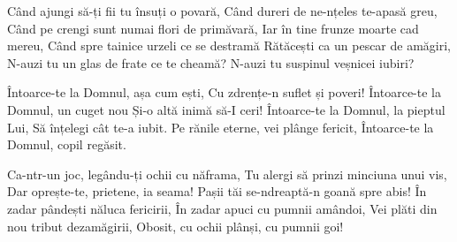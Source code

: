\beginverse
Când ajungi să-ți fii tu însuți o povară,
Când dureri de ne-nțeles te-apasă greu,
Când pe crengi sunt numai flori de primăvară,
Iar în tine frunze moarte cad mereu,
Când spre tainice urzeli ce se destramă
Rătăcești ca un pescar de amăgiri,
N-auzi tu un glas de frate ce te cheamă?
N-auzi tu suspinul veșnicei iubiri?
\endverse

\beginchorus
Întoarce-te la Domnul, așa cum ești,
Cu zdrențe-n suflet și poveri!
Întoarce-te la Domnul, un cuget nou
Și-o altă inimă să-I ceri!
Întoarce-te la Domnul, la pieptul Lui,
Să înțelegi cât te-a iubit.
Pe rănile eterne, vei plânge fericit,
Întoarce-te la Domnul, copil regăsit.
\endchorus

\beginverse
Ca-ntr-un joc, legându-ți ochii cu năframa,
Tu alergi să prinzi minciuna unui vis,
Dar oprește-te, prietene, ia seama!
Pașii tăi se-ndreaptă-n goană spre abis!
În zadar pândești năluca fericirii,
În zadar apuci cu pumnii amândoi,
Vei plăti din nou tribut dezamăgirii,
Obosit, cu ochii plânși, cu pumnii goi!
\endverse
\endsong